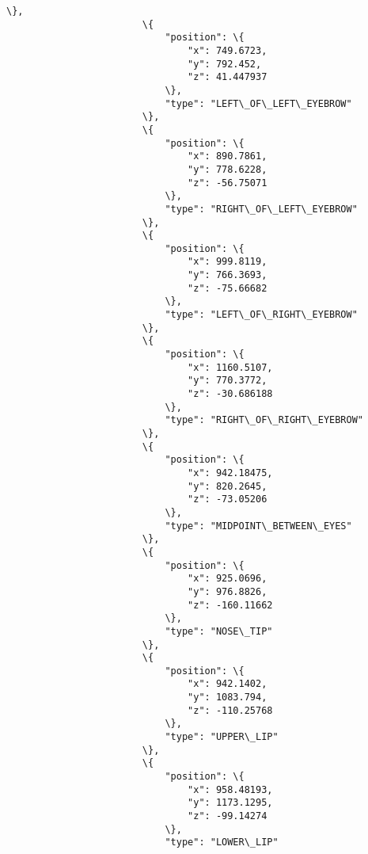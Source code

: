 \documentclass[11pt]{article}
\begin{document}
\begin{Verbatim}[commandchars=\\\{\}]
                        \},
                        \{
                            "position": \{
                                "x": 749.6723,
                                "y": 792.452,
                                "z": 41.447937
                            \},
                            "type": "LEFT\_OF\_LEFT\_EYEBROW"
                        \},
                        \{
                            "position": \{
                                "x": 890.7861,
                                "y": 778.6228,
                                "z": -56.75071
                            \},
                            "type": "RIGHT\_OF\_LEFT\_EYEBROW"
                        \},
                        \{
                            "position": \{
                                "x": 999.8119,
                                "y": 766.3693,
                                "z": -75.66682
                            \},
                            "type": "LEFT\_OF\_RIGHT\_EYEBROW"
                        \},
                        \{
                            "position": \{
                                "x": 1160.5107,
                                "y": 770.3772,
                                "z": -30.686188
                            \},
                            "type": "RIGHT\_OF\_RIGHT\_EYEBROW"
                        \},
                        \{
                            "position": \{
                                "x": 942.18475,
                                "y": 820.2645,
                                "z": -73.05206
                            \},
                            "type": "MIDPOINT\_BETWEEN\_EYES"
                        \},
                        \{
                            "position": \{
                                "x": 925.0696,
                                "y": 976.8826,
                                "z": -160.11662
                            \},
                            "type": "NOSE\_TIP"
                        \},
                        \{
                            "position": \{
                                "x": 942.1402,
                                "y": 1083.794,
                                "z": -110.25768
                            \},
                            "type": "UPPER\_LIP"
                        \},
                        \{
                            "position": \{
                                "x": 958.48193,
                                "y": 1173.1295,
                                "z": -99.14274
                            \},
                            "type": "LOWER\_LIP"

\end{Verbatim}
\end{document}
